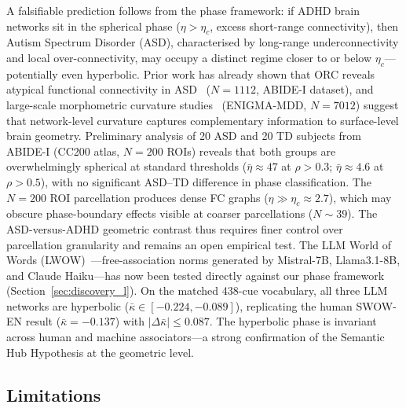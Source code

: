\documentclass[11pt,a4paper]{article}
\newcommand{\etac}{\eta_c}
\begin{document}
A falsifiable prediction follows from the phase framework: if ADHD brain networks sit in the spherical phase ($\eta > \etac$, excess short-range connectivity), then Autism Spectrum Disorder (ASD), characterised by long-range underconnectivity and local over-connectivity, may occupy a distinct regime closer to or below $\etac$---potentially even hyperbolic. Prior work has already shown that ORC reveals atypical functional connectivity in ASD~\cite{asd2022ricci} ($N=1112$, ABIDE-I dataset), and large-scale morphometric curvature studies~\cite{enigmamdd2025} (ENIGMA-MDD, $N=7012$) suggest that network-level curvature captures complementary information to surface-level brain geometry. Preliminary analysis of 20 ASD and 20 TD subjects from ABIDE-I (CC200 atlas, $N=200$ ROIs) reveals that both groups are overwhelmingly spherical at standard thresholds ($\bar{\eta} \approx 47$ at $\rho > 0.3$; $\bar{\eta} \approx 4.6$ at $\rho > 0.5$), with no significant ASD--TD difference in phase classification. The $N=200$ ROI parcellation produces dense FC graphs ($\eta \gg \etac \approx 2.7$), which may obscure phase-boundary effects visible at coarser parcellations ($N \sim 39$). The ASD-versus-ADHD geometric contrast thus requires finer control over parcellation granularity and remains an open empirical test. The LLM World of Words (LWOW)~\cite{chankhanna2025worldofwords}---free-association norms generated by Mistral-7B, Llama3.1-8B, and Claude Haiku---has now been tested directly against our phase framework (Section~\ref{sec:discovery_l}). On the matched 438-cue vocabulary, all three LLM networks are hyperbolic ($\bar{\kappa} \in [-0.224, -0.089]$), replicating the human SWOW-EN result ($\bar{\kappa}=-0.137$) with $|\Delta\bar{\kappa}| \leq 0.087$. The hyperbolic phase is invariant across human and machine associators---a strong confirmation of the Semantic Hub Hypothesis at the geometric level.

\subsection{Limitations}
\end{document}
